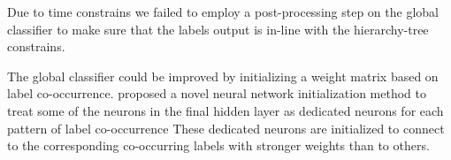 \documentclass[11pt,a4paper]{article}
\begin{document}
Due to time constrains we failed to employ a post-processing step on the global
classifier to make sure that the labels output is in-line with the hierarchy-tree
constrains.

The global classifier could be improved by initializing a weight matrix based on
label co-occurrence. \citet{kurata-etal-2016-improved} proposed a novel neural
network initialization method to treat some of the neurons in the final
hidden layer as dedicated neurons for each pattern of label co-occurrence
These dedicated neurons are initialized to connect to the corresponding
co-occurring labels with stronger weights than to others.



\end{document}
